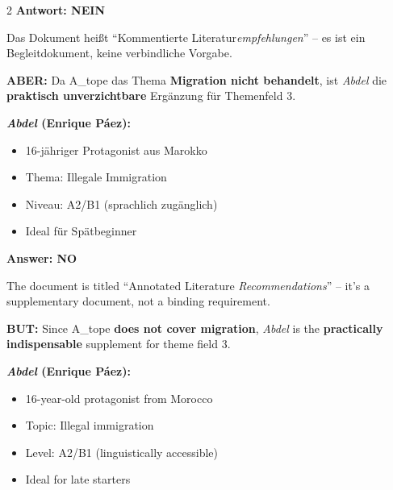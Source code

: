 \documentclass[10pt,a4paper]{article}
\begin{document}
\vspace{2mm}

\begin{paracol}{2}
\small
\textbf{Antwort: NEIN}\footnotemark[18]

Das Dokument heißt ``Kommentierte Literatur\textit{empfehlungen}'' -- es ist ein Begleitdokument, keine verbindliche Vorgabe.

\textbf{ABER:} Da A\_tope das Thema \textbf{Migration nicht behandelt}, ist \textit{Abdel} die \textbf{praktisch unverzichtbare} Ergänzung für Themenfeld 3.

\textbf{\textit{Abdel} (Enrique Páez):}
\begin{itemize}[noitemsep,topsep=2pt]
\item 16-jähriger Protagonist aus Marokko
\item Thema: Illegale Immigration
\item Niveau: A2/B1 (sprachlich zugänglich)
\item Ideal für Spätbeginner
\end{itemize}

\switchcolumn

\small\color{english}
\textbf{Answer: NO}\footnotemark[18]

The document is titled ``Annotated Literature \textit{Recommendations}'' -- it's a supplementary document, not a binding requirement.

\textbf{BUT:} Since A\_tope \textbf{does not cover migration}, \textit{Abdel} is the \textbf{practically indispensable} supplement for theme field 3.

\textbf{\textit{Abdel} (Enrique Páez):}
\begin{itemize}[noitemsep,topsep=2pt]
\item 16-year-old protagonist from Morocco
\item Topic: Illegal immigration
\item Level: A2/B1 (linguistically accessible)
\item Ideal for late starters
\end{itemize}

\end{paracol}


\vspace{3mm}
\end{document}
